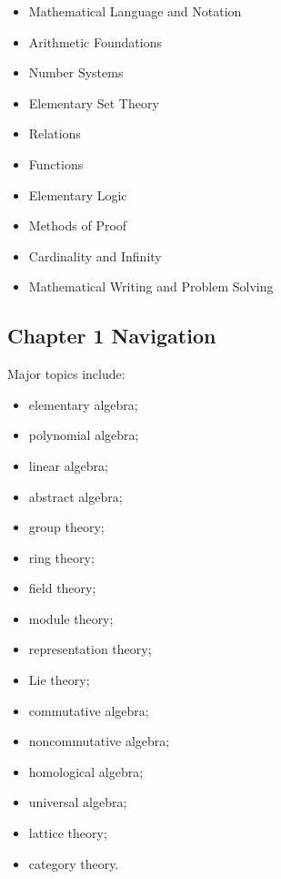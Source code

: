 \begin{itemize}
    \item Mathematical Language and Notation
    \item Arithmetic Foundations
    \item Number Systems
    \item Elementary Set Theory
    \item Relations
    \item Functions
    \item Elementary Logic
    \item Methods of Proof
    \item Cardinality and Infinity
    \item Mathematical Writing and Problem Solving
\end{itemize}

\subsection{Chapter 1 Navigation}
\label{subsec:index-chapter-one}

Major topics include:

\begin{itemize}
    \item elementary algebra;
    \item polynomial algebra;
    \item linear algebra;
    \item abstract algebra;
    \item group theory;
    \item ring theory;
    \item field theory;
    \item module theory;
    \item representation theory;
    \item Lie theory;
    \item commutative algebra;
    \item noncommutative algebra;
    \item homological algebra;
    \item universal algebra;
    \item lattice theory;
    \item category theory.
\end{itemize}

